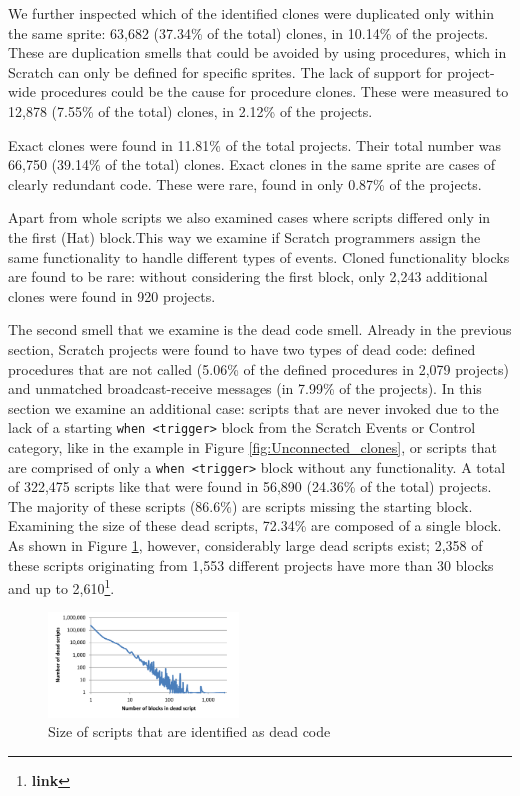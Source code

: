 \documentclass{sig-alternate}
\newcommand{\todo}[1]{\textbf{#1}}
\begin{document}
We further inspected which of the identified clones were duplicated only within the same sprite: 63,682 (37.34\% of the total) clones, in 10.14\% of the projects. These are duplication smells that could be avoided by using procedures, which in Scratch can only be defined for specific sprites. The lack of support for project-wide procedures could be the cause for procedure clones. These were measured to 12,878 (7.55\% of the total) clones, in 2.12\% of the projects.

Exact clones were found in 11.81\% of the total projects. Their total number was 66,750 (39.14\% of the total) clones. Exact clones in the same sprite are cases of clearly redundant code. These were rare, found in only 0.87\% of the projects.

Apart from whole scripts we also examined cases where scripts differed only in the first (Hat) block.This way we examine if Scratch programmers assign the same functionality to handle different types of events. Cloned functionality blocks are found to be rare: without considering the first block, only 2,243 additional clones were found in 920 projects.

The second smell that we examine is the dead code smell. Already in the previous section, Scratch projects were found to have two types of dead code: defined procedures that are not called (5.06\% of the defined procedures in 2,079 projects) and unmatched broadcast-receive messages (in 7.99\% of the projects). In this section we examine an additional case: scripts that are never invoked due to the lack of a starting \texttt{when <trigger>} block from the Scratch Events or Control category, like in the example in Figure \ref{fig:Unconnected_clones}, or scripts that are comprised of only a \texttt{when <trigger>} block without any functionality. A total of 322,475 scripts like that were found in 56,890 (24.36\% of the total) projects. The majority of these scripts (86.6\%) are scripts missing the starting block. Examining the size of these dead scripts, 72.34\% are composed of a single block. As shown in Figure \ref{fig:deadcode}, however, considerably large dead scripts exist; 2,358 of these scripts originating from 1,553 different projects have more than 30 blocks and up to 2,610\footnote{\todo{link}}.

\begin{figure}
	\centering
	\includegraphics[width=0.45\textwidth]{fig/charts/12deadcode}
	\caption{Size of scripts that are identified as dead code}
	\label{fig:deadcode}
\end{figure}
\end{document}
